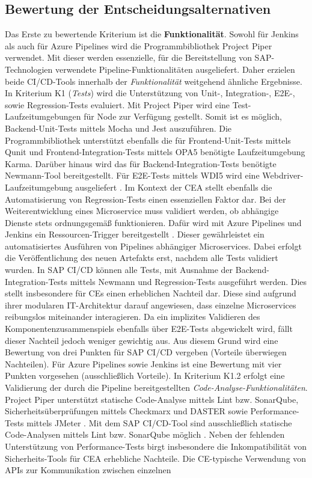 \subsection{Bewertung der Entscheidungsalternativen}
\label{sec:Bewertung}
Das Erste zu bewertende Kriterium ist die \textbf{Funktionalität}. Sowohl für Jenkins als auch für Azure Pipelines wird die Programmbibliothek Project Piper verwendet. Mit dieser werden essenzielle, für die Bereitstellung von SAP-Technologien verwendete Pipeline-Funktionalitäten ausgeliefert. Daher erzielen beide CI/CD-Tools innerhalb der \textit{Funktionalität} weitgehend ähnliche Ergebnisse. In Kriterium K1 (\textit{Tests}) wird die Unterstützung von Unit-, Integration-, E2E-, sowie Regression-Tests evaluiert. Mit Project Piper wird eine Test-Laufzeitumgebungen für Node zur Verfügung gestellt. Somit ist es möglich, Backend-Unit-Tests mittels Mocha und Jest auszuführen. Die Programmbibliothek unterstützt ebenfalls die für Frontend-Unit-Tests mittels Qunit und Frontend-Integration-Tests mittels OPA5 benötigte Laufzeitumgebung Karma. Darüber hinaus wird das für Backend-Integration-Tests benötigte Newmann-Tool bereitgestellt. Für E2E-Tests mittels WDI5 wird eine Webdriver-Laufzeitumgebung ausgeliefert \cite[Z. 63 ff.]{TestDeveloperSAPHyperspaceAdoption&Onboarding.}. Im Kontext der CEA stellt ebenfalls die Automatisierung von Regression-Tests einen essenziellen Faktor dar. Bei der Weiterentwicklung eines Microservice muss validiert werden, ob abhängige Dienste stets ordnungsgemäß funktionieren. Dafür wird mit Azure Pipelines und Jenkins ein Ressourcen-Trigger bereitgestellt \cite{Steved0x.20230410}. Dieser gewährleistet ein automatisiertes Ausführen von Pipelines abhängiger Microservices. Dabei erfolgt die Veröffentlichung des neuen Artefakts erst, nachdem alle Tests validiert wurden. In SAP CI/CD können alle Tests, mit Ausnahme der Backend-Integration-Tests mittels Newmann und Regression-Tests ausgeführt werden. Dies stellt insbesondere für CEs einen erheblichen Nachteil dar. Diese sind aufgrund ihrer modularen IT-Architektur darauf angewiesen, dass einzelne Microservices reibungslos miteinander interagieren. Da ein implizites Validieren des Komponentenzusammenspiels ebenfalls über E2E-Tests abgewickelt wird, fällt dieser Nachteil jedoch weniger gewichtig aus. Aus diesem Grund wird eine Bewertung von drei Punkten für SAP CI/CD vergeben (Vorteile überwiegen Nachteilen). Für Azure Pipelines sowie Jenkins ist eine Bewertung mit vier Punkten vorgesehen (ausschließlich Vorteile). In Kriterium K1.2 erfolgt eine Validierung der durch die Pipeline bereitgestellten \textit{Code-Analyse-Funktionalitäten}. Project Piper unterstützt statische Code-Analyse mittels Lint bzw. SonarQube, Sicherheitsüberprüfungen mittels Checkmarx und DASTER sowie Performance-Tests mittels JMeter \cite[Z. 43 ff.]{ProductManagerSAPHyperspaceSecurityTools.}. Mit dem SAP CI/CD-Tool sind ausschließlich statische Code-Analysen mittels Lint bzw. SonarQube möglich \cite[Z. 47 ff.]{ProductOwnerSAPBTPProd&Infra.}. Neben der fehlenden Unterstützung von Performance-Tests birgt insbesondere die Inkompatibilität von Sicherheits-Tools für CEA erhebliche Nachteile. Die CE-typische Verwendung von APIs zur Kommunikation zwischen einzelnen 